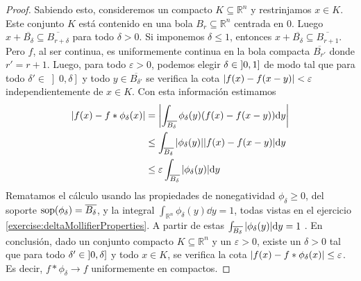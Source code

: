 \documentclass{article}
\newcommand{\realNumbers}{\mathbb{R}}
\DeclareMathOperator{\support}{\textnormal{sop}}
\newcommand{\leftOpenInterval}{\left]}
\newcommand{\rightOpenInterval}{\right[}
\newcommand{\leftClosedInterval}{\left[}
\newcommand{\rightClosedInterval}{\right]}
\newcommand{\interval}[3]{%
  \ifstrequal{#1}{oo}{%
    \leftOpenInterval #2, #3 \rightOpenInterval%
  }{%
    \ifstrequal{#1}{co}{%
      \leftClosedInterval #2, #3 \rightOpenInterval%
    }{%
      \ifstrequal{#1}{oc}{
        \leftOpenInterval #2, #3 \rightClosedInterval%
      }{%
        \ifstrequal{#1}{cc}{
          \leftClosedInterval #2, #3 \rightClosedInterval
        }{%
        }%
      }%
    }%
  }%
}
\theoremstyle{remark}
\begin{document}
\begin{proof}
  Sabiendo esto, consideremos un compacto \(K \subseteq \realNumbers^n\) y restrinjamos \(x \in K\).
  Este conjunto \(K\) está contenido en una bola \(B_r \subseteq \realNumbers^n\) centrada en 0.
  Luego \(x + \overline{B_{\delta}} \subseteq \overline{B_{r + \delta}}\) para todo \(\delta > 0\).
  Si imponemos \(\delta \leq 1\), entonces \(x + \overline{B_{\delta}} \subseteq \overline{B_{r + 1}}\).
  Pero \(f\), al ser continua, es uniformemente continua en la bola compacta \(\overline{B_{r'}}\) donde \(r' = r + 1\).
  Luego, para todo \(\varepsilon > 0\), podemos elegir \(\delta \in \interval{oc}{0}{1}\) de modo tal que para todo \(\delta' \in \left]0, \delta \right]\) y todo \(y \in \overline{B_{\delta'}}\) se verifica la cota \(\abs{f(x) - f(x - y)} < \varepsilon\) independientemente de \(x \in K\).
  Con esta información estimamos
  \begin{align}
    \abs{
      f(x) - f * \phi_{\delta} (x)
    }
    &=
    \abs{
      \int_{\overline{B_{\delta}}} 
        \phi_{\delta}(y) (f(x) - f(x - y)) 
      \dd y
    }
    \\
    &\leq
    \int_{\overline{B_{\delta}}}
      \abs{\phi_{\delta}(y)} \abs{f(x) - f(x - y)}
    \dd y
    \\
    &\leq
    \varepsilon
    \int_{\overline{B_{\delta}}}
      \abs{\phi_{\delta}(y)}
    \dd y
  \end{align}
  Rematamos el cálculo usando las propiedades de nonegatividad \(\phi_{\delta} \geq 0\), del soporte \(\support(\phi_{\delta}) = \overline{B_{\delta}}\), y la integral \(\int_{\realNumbers^n} \phi_{\delta}(y) \dd y = 1\), todas vistas en el ejercicio \ref{exercise:deltaMollifierProperties}.
  A partir de estas 
  \(
    \int_{\overline{B_{\delta}}}
      \abs{\phi_{\delta}(y)}
    \dd y
    =
    1
  \)
  .
  En conclusión, dado un conjunto compacto \(K \subseteq \realNumbers^n\) y un \(\varepsilon > 0\), existe un \(\delta > 0\) tal que para todo \(\delta' \in \interval{oc}{0}{\delta}\) y todo \(x \in K\), se verifica la cota \(\abs{f(x) - f * \phi_{\delta}(x)} \leq \varepsilon\).
  Es decir, \(f * \phi_{\delta} \rightarrow f\) uniformemente en compactos.
\end{proof}
\end{document}
